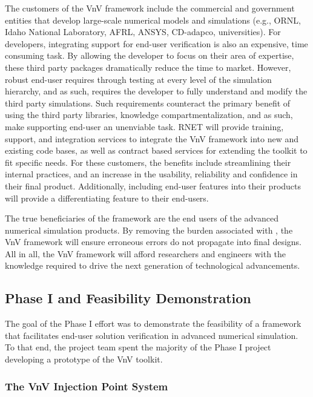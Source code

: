 The customers of the VnV framework include the commercial and government entities that develop large-scale numerical models and simulations (e.g., ORNL, Idaho National Laboratory, AFRL, ANSYS, CD-adapco, universities). For developers, integrating support for end-user verification is also an expensive, time consuming task.  By allowing the developer to focus on their area of expertise, these third party packages dramatically reduce the time to market. However, robust end-user \VV requires through testing at every level of the simulation hierarchy, and as such, requires the developer to fully understand and modify the third party simulations. Such requirements counteract the primary benefit of using the third party libraries, knowledge compartmentalization, and as such, make supporting end-user \VV an unenviable task.  RNET will provide training, support, and integration services to integrate the VnV framework into new and existing code bases, as well as contract based services for extending the toolkit to fit specific needs. For these customers, the benefits include streamlining their internal \VV practices, and an increase in the usability, reliability and confidence in their final product. Additionally, including end-user \VV features into their products will provide a differentiating feature to their end-users. 

The true beneficiaries of the \VV framework are the end users of the advanced numerical simulation products. By removing the burden associated with \VV, the VnV framework will ensure erroneous errors do not propagate into final designs. All in all, the VnV framework will afford researchers and engineers with the knowledge required to drive the next generation of technological advancements. 

\subsection{Phase I and Feasibility Demonstration}

The goal of the Phase I effort was to demonstrate the feasibility of a framework that facilitates end-user solution
verification in advanced numerical simulation. To that end, the project team spent the majority of the Phase I
project developing a prototype of the VnV toolkit.

\subsubsection{The VnV Injection Point System}


